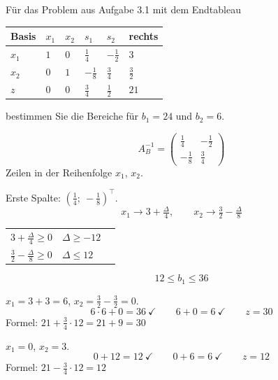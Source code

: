 \begin{aufgabe}
Für das Problem aus Aufgabe 3.1 mit dem Endtableau
\begin{center}
{\small
\renewcommand{\arraystretch}{1.44}
\begin{tabular}{@{}P{1.6cm}P{1.4cm}P{1.4cm}P{1.4cm}P{1.4cm}P{1.4cm}@{}}
\toprule
\textbf{Basis} & $x_1$ & $x_2$ & $s_1$ & $s_2$ & \textbf{rechts}\\
\midrule
$x_1$ & $1$ & $0$ & $\tfrac14$ & $-\tfrac12$ & $3$\\
$x_2$ & $0$ & $1$ & $-\tfrac18$ & $\tfrac34$ & $\tfrac32$\\
\midrule
$z$ & $0$ & $0$ & $\tfrac34$ & $\tfrac12$ & $21$\\
\bottomrule
\end{tabular}}
\end{center}
bestimmen Sie die Bereiche für $b_1 = 24$ und $b_2 = 6$.

\loesung
{}
\[ A_B^{-1} = \begin{pmatrix} \tfrac14 & -\tfrac12\\[2pt] -\tfrac18 & \tfrac34\end{pmatrix} \]
Zeilen in der Reihenfolge $x_1$, $x_2$.

Erste Spalte: $\left(\tfrac14;\ -\tfrac18\right)^{\!\top}$.
\[ x_1 \to 3+\tfrac{\Delta}{4}, \qquad x_2 \to \tfrac32 - \tfrac{\Delta}{8} \]

\begin{center}
\renewcommand{\arraystretch}{1.48}
\begin{tabular}{@{}P{2.8cm}P{2.4cm}P{2.4cm}@{}}
\toprule
$3+\tfrac{\Delta}{4}\ge0$ & $\Delta \ge -12$ & \\
$\tfrac32-\tfrac{\Delta}{8}\ge0$ & $\Delta \le 12$ & \\
\bottomrule
\end{tabular}
\end{center}

\[ 12 \le b_1 \le 36 \]

 $x_1 = 3+3 = 6$, $x_2 = \tfrac32 - \tfrac32 = 0$.
\[ 6\cdot6+0 = 36 \ \checkmark \qquad 6+0 = 6 \ \checkmark \qquad z = 30 \]
Formel: $21 + \tfrac34\cdot12 = 21+9 = 30$ \checkmark

 $x_1 = 0$, $x_2 = 3$.
\[ 0+12 = 12 \ \checkmark \qquad 0+6 = 6 \ \checkmark \qquad z = 12 \]
Formel: $21 - \tfrac34\cdot12 = 12$ \checkmark


\end{aufgabe}
